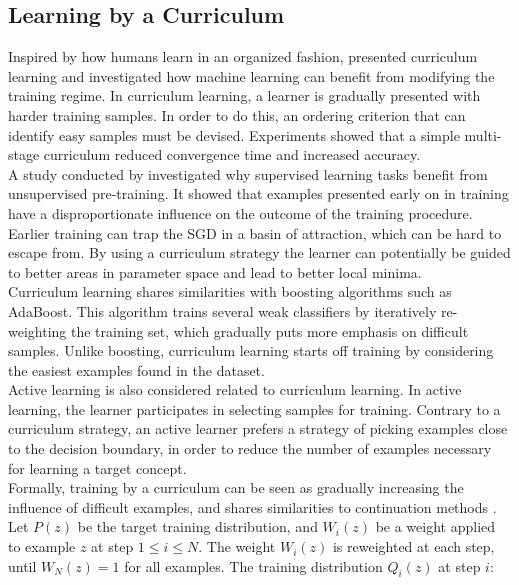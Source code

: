 
\subsection{Learning by a Curriculum}
Inspired by how humans learn in an organized fashion, \cite{Bengio_curriculumlearning} presented curriculum learning and investigated how machine learning can benefit from modifying the training regime. In curriculum learning, a learner is gradually presented with harder training samples. In order to do this, an ordering criterion that can identify easy samples must be devised. Experiments showed that a simple multi-stage curriculum reduced convergence time and increased accuracy. \\

A study conducted by \cite{Erhan-unsupervised-pre-training} investigated why supervised learning tasks benefit from unsupervised pre-training. It showed that examples presented early on in training have a disproportionate influence on the outcome of the training procedure. Earlier training can trap the \ac{SGD} in a basin of attraction, which can be hard to escape from.  By using a curriculum strategy the learner can potentially be guided to better areas in parameter space and lead to better local minima. \\

Curriculum learning shares similarities with boosting algorithms such as AdaBoost. This algorithm trains several weak classifiers by iteratively re-weighting the training set, which gradually puts more emphasis on difficult samples. Unlike boosting, curriculum learning starts off training by considering the easiest examples found in the dataset.\\

Active learning \citep{Cohn_active_learning} is also considered related to curriculum learning. In active learning, the learner participates in selecting samples for training. Contrary to a curriculum strategy, an active learner prefers a strategy of picking examples close to the decision boundary, in order to reduce the number of examples necessary for learning a target concept.\\

Formally, training by a curriculum can be seen as gradually increasing the influence of difficult examples, and shares similarities to continuation methods \citep{Bengio_curriculumlearning}. Let $P(z)$ be the target training distribution, and $W_{i}(z)$ be a weight applied to example $z$ at step $1\leq i\leq N$. The weight $W_{i}(z)$ is reweighted at each step, until $W_{N}(z) = 1$ for all examples.  The training distribution  $Q_{i}(z)$ at step $i$:

